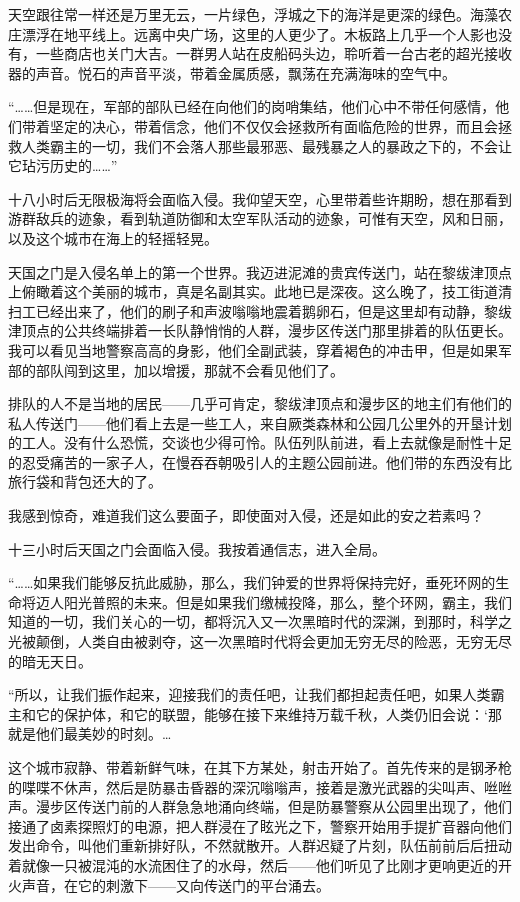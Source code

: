 \documentclass[AutoFakeBold=true]{book}
\begin{document}
天空跟往常一样还是万里无云，一片绿色，浮城之下的海洋是更深的绿色。海藻农庄漂浮在地平线上。远离中央广场，这里的人更少了。木板路上几乎一个人影也没有，一些商店也关门大吉。一群男人站在皮船码头边，聆听着一台古老的超光接收器的声音。悦石的声音平淡，带着金属质感，飘荡在充满海味的空气中。

``……但是现在，军部的部队已经在向他们的岗哨集结，他们心中不带任何感情，他们带着坚定的决心，带着信念，他们不仅仅会拯救所有面临危险的世界，而且会拯救人类霸主的一切，我们不会落人那些最邪恶、最残暴之人的暴政之下的，不会让它玷污历史的……''

十八小时后无限极海将会面临入侵。我仰望天空，心里带着些许期盼，想在那看到游群敌兵的迹象，看到轨道防御和太空军队活动的迹象，可惟有天空，风和日丽，以及这个城市在海上的轻摇轻晃。

天国之门是入侵名单上的第一个世界。我迈进泥滩的贵宾传送门，站在黎绂津顶点上俯瞰着这个美丽的城市，真是名副其实。此地已是深夜。这么晚了，技工街道清扫工已经出来了，他们的刷子和声波嗡嗡地震着鹅卵石，但是这里却有动静，黎绂津顶点的公共终端排着一长队静悄悄的人群，漫步区传送门那里排着的队伍更长。我可以看见当地警察高高的身影，他们全副武装，穿着褐色的冲击甲，但是如果军部的部队闯到这里，加以增援，那就不会看见他们了。

排队的人不是当地的居民——几乎可肯定，黎绂津顶点和漫步区的地主们有他们的私人传送门——他们看上去是一些工人，来自厥类森林和公园几公里外的开垦计划的工人。没有什么恐慌，交谈也少得可怜。队伍列队前进，看上去就像是耐性十足的忍受痛苦的一家子人，在慢吞吞朝吸引人的主题公园前进。他们带的东西没有比旅行袋和背包还大的了。

我感到惊奇，{\kaishu 难道我们这么要面子，即使面对入侵，还是如此的安之若素吗？}

十三小时后天国之门会面临入侵。我按着通信志，进入全局。

``……如果我们能够反抗此威胁，那么，我们钟爱的世界将保持完好，垂死环网的生命将迈人阳光普照的未来。但是如果我们缴械投降，那么，整个环网，霸主，我们知道的一切，我们关心的一切，都将沉入又一次黑暗时代的深渊，到那时，科学之光被颠倒，人类自由被剥夺，这一次黑暗时代将会更加无穷无尽的险恶，无穷无尽的暗无天日。

``所以，让我们振作起来，迎接我们的责任吧，让我们都担起责任吧，如果人类霸主和它的保护体，和它的联盟，能够在接下来维持万载千秋，人类仍旧会说：`那就是他们最美妙的时刻。…

这个城市寂静、带着新鲜气味，在其下方某处，射击开始了。首先传来的是钢矛枪的喋喋不休声，然后是防暴击昏器的深沉嗡嗡声，接着是激光武器的尖叫声、咝咝声。漫步区传送门前的人群急急地涌向终端，但是防暴警察从公园里出现了，他们接通了卤素探照灯的电源，把人群浸在了眩光之下，警察开始用手提扩音器向他们发出命令，叫他们重新排好队，不然就散开。人群迟疑了片刻，队伍前前后后扭动着就像一只被混沌的水流困住了的水母，然后——他们听见了比刚才更响更近的开火声音，在它的刺激下——又向传送门的平台涌去。
\end{document}
